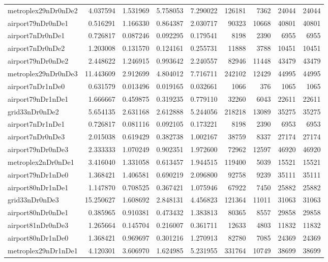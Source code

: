\begin{longtable}{|l|r|r|r|r|r|r|r|r|}
metroplex29nDr0nDe2 & 4.037594 & 1.531969 & 5.758053 & 7.290022 & 126181 & 7362 & 24044 & 24044 \\
airport79nDr0nDe1 & 0.516291 & 1.166330 & 0.864387 & 2.030717 & 90323 & 10668 & 40801 & 40801 \\
airport7nDr0nDe1 & 0.726817 & 0.087246 & 0.092295 & 0.179541 & 8198 & 2390 & 6955 & 6955 \\
airport7nDr0nDe2 & 1.203008 & 0.131570 & 0.124161 & 0.255731 & 11888 & 3788 & 10451 & 10451 \\
airport79nDr0nDe2 & 2.448622 & 1.246915 & 0.993642 & 2.240557 & 82946 & 11448 & 43479 & 43479 \\
metroplex29nDr0nDe3 & 11.443609 & 2.912699 & 4.804012 & 7.716711 & 242102 & 12429 & 44995 & 44995 \\
airport7nDr1nDe0 & 0.631579 & 0.013496 & 0.019165 & 0.032661 & 1066 & 376 & 1065 & 1065 \\
airport79nDr1nDe1 & 1.666667 & 0.459875 & 0.319235 & 0.779110 & 32260 & 6043 & 22611 & 22611 \\
grid33nDr0nDe2 & 5.654135 & 2.631168 & 2.612888 & 5.244056 & 218218 & 13089 & 35275 & 35275 \\
airport7nDr1nDe1 & 0.726817 & 0.081116 & 0.092105 & 0.173221 & 8198 & 2390 & 6953 & 6953 \\
airport7nDr0nDe3 & 2.015038 & 0.619429 & 0.382738 & 1.002167 & 38759 & 8337 & 27174 & 27174 \\
airport79nDr0nDe3 & 2.333333 & 1.070249 & 0.902351 & 1.972600 & 72962 & 12597 & 46920 & 46920 \\
metroplex2nDr0nDe1 & 3.416040 & 1.331058 & 0.613457 & 1.944515 & 119400 & 5039 & 15521 & 15521 \\
airport79nDr1nDe0 & 1.368421 & 1.406581 & 0.690219 & 2.096800 & 92758 & 9239 & 35111 & 35111 \\
airport80nDr1nDe1 & 1.147870 & 0.708525 & 0.367421 & 1.075946 & 67922 & 7450 & 25882 & 25882 \\
grid33nDr0nDe3 & 15.250627 & 1.608692 & 2.848131 & 4.456823 & 121364 & 11011 & 31063 & 31063 \\
airport80nDr0nDe1 & 0.385965 & 0.910381 & 0.473432 & 1.383813 & 80365 & 8557 & 29858 & 29858 \\
airport81nDr0nDe3 & 1.265664 & 0.145704 & 0.216007 & 0.361711 & 12633 & 4803 & 11832 & 11832 \\
airport80nDr1nDe0 & 1.368421 & 0.969697 & 0.301216 & 1.270913 & 82780 & 7085 & 24369 & 24369 \\
metroplex29nDr1nDe1 & 4.120301 & 3.606970 & 1.624985 & 5.231955 & 331764 & 10749 & 38699 & 38699 \\

\end{longtable}
